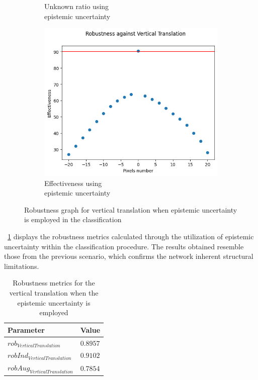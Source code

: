 \begin{figure}[h]
\begin{subfigure}{.33\textwidth}
		\caption{Unknown ratio using \\ epistemic uncertainty}
		\label{fig:vt_eu_unkn}
	\end{subfigure}%
	\begin{subfigure}{.33\textwidth}
		\centering
		\includegraphics[width=0.9\linewidth]{ImageFiles/EvalBNN/VT/EU/eff}
		\caption{Effectiveness using \\ epistemic uncertainty}
		\label{fig:vt_eu_eff}
	\end{subfigure}
	\caption{Robustness graph for vertical translation when epistemic uncertainty is employed in the classification}
	\label{fig:vt_eu}
\end{figure}

\Tab~\ref{table:rob_vt_eu} displays the robustness metrics calculated through the utilization of epistemic uncertainty within the classification procedure. The results obtained resemble those from the previous scenario, which confirms the network inherent structural limitations.

\begin{table}[h]
	\centering
	\begin{tabular}{|| l | l ||} 
		\hline
		\textbf{Parameter} & \textbf{Value} \\
		\hline
		\hline
		$rob_{VerticalTranslation}$ & $0.8957$ \\
		$robInd_{VerticalTranslation}$ & $0.9102$ \\
		$robAug_{VerticalTranslation}$ & $0.7854$ \\	
		\hline
	\end{tabular}	
	\caption{Robustness metrics for the vertical translation when the epistemic uncertainty is employed}
	\label{table:rob_vt_eu}
\end{table}

